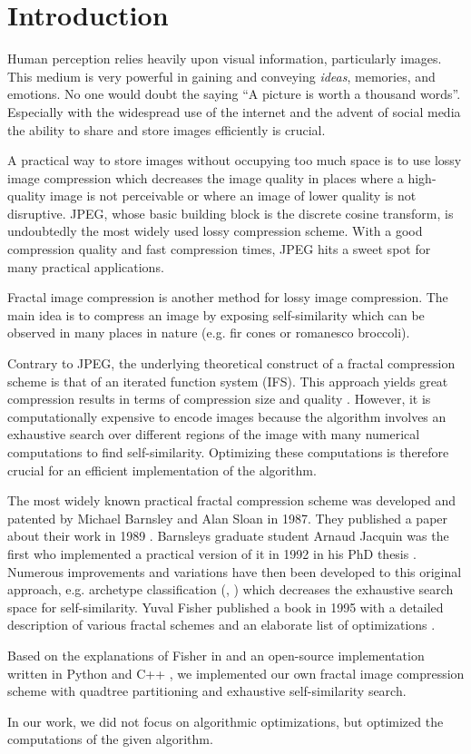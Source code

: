 \section{Introduction}\label{sec:intro}

Human perception relies heavily upon visual information, particularly images.
This medium is very powerful in gaining and conveying \textit{ideas}, memories,
and emotions. No one would doubt the saying ``A picture is worth a thousand
words''. Especially with the widespread use of the internet and the advent of
social media the ability to share and store images efficiently is crucial.

A practical way to store images without occupying too much space is to use lossy
image compression which decreases the image quality in places where a
high-quality image is not perceivable or where an image of lower quality is not
disruptive. JPEG, whose basic building block is the discrete cosine transform,
is undoubtedly the most widely used lossy compression scheme. With a good
compression quality and fast compression times, JPEG hits a sweet spot for many
practical applications.

Fractal image compression is another method for lossy image compression. The
main idea is to compress an image by exposing self-similarity which can be
observed in many places in nature (e.g. fir cones or romanesco broccoli).

Contrary to JPEG, the underlying theoretical construct of a fractal compression
scheme is that of an iterated function system (IFS). This approach yields great
compression results in terms of compression size and quality \cite{fisher2012}.
However, it is computationally expensive to encode images because the algorithm
involves an exhaustive search over different regions of the image with many
numerical computations to find self-similarity. Optimizing these computations is
therefore crucial for an efficient implementation of the algorithm.

 The most widely known practical fractal compression scheme
was developed and patented by Michael Barnsley and Alan Sloan in 1987. They
published a paper about their work in 1989 \cite{barnsley1989fractal}. Barnsleys
graduate student Arnaud Jacquin was the first who implemented a practical
version of it in 1992 in his PhD thesis \cite{jacquin1990fractal}. Numerous
improvements and variations have then been developed to this original approach,
e.g. archetype classification (\cite{jacobs1992image}, \cite{boss1991studies})
which decreases the exhaustive search space for self-similarity. Yuval Fisher
published a book in 1995 with a detailed description of various fractal schemes
and an elaborate list of optimizations \cite{fisher2012}.

 Based on the explanations of Fisher in \cite{fisher2012}
and an open-source implementation written in Python \cite{github-python} and C++
\cite{github-cpp}, we implemented our own fractal image compression scheme with
quadtree partitioning and exhaustive self-similarity search.

In our work, we did not focus on algorithmic optimizations, but optimized the
computations of the given algorithm.

